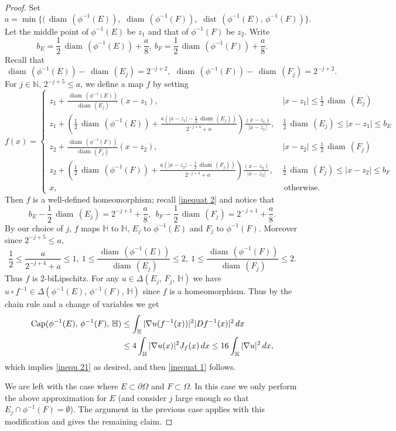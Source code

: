 \documentclass[reqno,11pt]{amsart}
\def\dist{{\mathop\mathrm{\,dist\,}}}
\def\diam{{\mathop\mathrm{\,diam\,}}}
\numberwithin{equation}{section}
\theoremstyle{remark}
\begin{document}
\begin{proof}
 Set 
$$a=\min\{(\diam(\phi^{-1}(E)),\,\diam(\phi^{-1}(F)),\,\dist(\phi^{-1}(E),\,\phi^{-1}(F))\}.$$ 
Let the middle point of $\phi^{-1}(E)$ be $z_1$ and that of $\phi^{-1}(F)$ be $z_2$. 
Write 
\begin{equation}\label{inequat 2}
b_E=\frac 1 2 \diam(\phi^{-1}(E)) +\frac a 8,\ b_F=\frac 1 2 \diam(\phi^{-1}(F)) +\frac a 8.
\end{equation}
Recall that
$$\diam(\phi^{-1}(E))-\diam(E_j) = 2^{-j+2},\ \diam(\phi^{-1}(F))-\diam(F_j) = 2^{-j+2}. $$
For $j\in \mathbb N,\, 2^{-j+5}\le a$, we define a map $f$ by setting
$$ f(x)=
 \begin{cases}
   z_1+\frac{\diam(\phi^{-1}(E))}{\diam(E_j)}(x-z_1), & \,  |x-z_1|\le \frac 1 2 \diam(E_j) \\
  z_1+\left(\frac 1 2 \diam(\phi^{-1}(E)) + \frac{ a \left(|x-z_1|-\frac 1 2 \diam(E_j)\right)}{ 2^{-j+4}+ a}  \right)\frac {(x-z_1)}{|x-z_1|}, &   \, \frac 1 2 \diam(E_j)\le |x-z_1|\le b_E \\
   z_2+\frac{\diam(\phi^{-1}(F))}{\diam(F_j)}(x-z_2), & \,  |x-z_2|\le \frac 1 2 \diam(F_j) \\
   z_2+\left(\frac 1 2 \diam(\phi^{-1}(F)) + \frac{ a \left(|x-z_2|-\frac 1 2 \diam(F_j)\right) }{ 2^{-j+4}+ a}\right) \frac {(x-z_2)}{|x-z_2|}, &   \, \frac 1 2 \diam(F_j)\le |x-z_2|\le b_F \\
    x , & \text{ otherwise.}
 \end{cases}$$
 Then $f$ is a well-defined homeomorphism; recall \eqref{inequat 2} and notice that
 $$b_E-\frac 1 2 \diam(E_j)= 2^{-j+1}+\frac a 8, \ \ b_F-\frac 1 2 \diam(F_j)= 2^{-j+1}+\frac a 8.$$
By our choice of $j$, $f$  maps $\mathbb H$ to $\mathbb H$, $E_j$ to $\phi^{-1}(E)$ and $F_j$ to $\phi^{-1}(F)$. Moreover since $2^{-j+5}\le a$, 
$$ \frac 1 2 \le \frac { a }{ 2^{-j+4}+a}\le 1 ,\ 1\le \frac{\diam(\phi^{-1}(E))}{\diam(E_j)}\le 2,\  1\le \frac{\diam(\phi^{-1}(F))}{\diam(F_j)} \le 2.$$
Thus $f$ is $2$-biLipschitz. For any $u\in \Delta(E_j ,\, F_j,\,\mathbb H)$ we have $u\circ f^{-1}\in \Delta( \phi^{-1}(E) ,\,  \phi^{-1}(F),\,\mathbb H)$ since $f$ is a homeomorphism. Thus by the chain rule and  a change of variables we get
\begin{align*}
{\rm Cap}(\phi^{-1}(E) ,\, \phi^{-1}(F) ,\,  \mathbb H)& \le  \int_{\mathbb H} |\nabla u(f^{-1}(x))|^2 |Df^{-1}(x)|^2 \, dx\\
&\le 4 \int_{\mathbb H} |\nabla u(x)|^2  J_{f}(x) \, dx \le 16 \int_{\mathbb H} |\nabla u|^2 \, dx,
\end{align*}
which implies \eqref{inequ 21} as desired, and then \eqref{inequat 1} follows. 

 We are left with the case  where $E\subset \partial\Omega$ and $F\subset\Omega$. In this case we  only perform the above approximation for $E$ (and consider $j$ large enough so that $E_j\cap \phi^{-1}(F)=\emptyset$). The argument in the previous case applies with this modification and gives the remaining claim. 
\end{proof}
\end{document}
